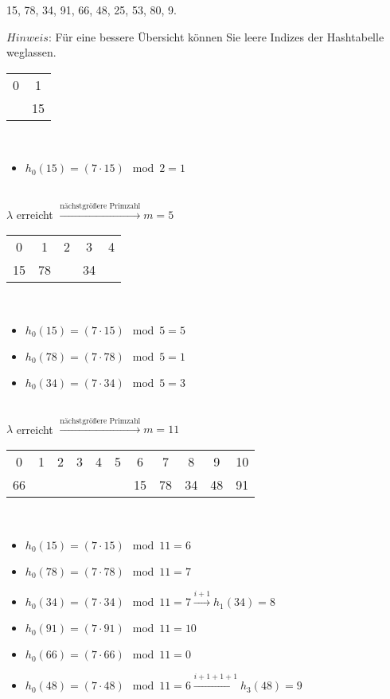 \documentclass[a4paper]{article}
\begin{document}
\begin{center}
    15, 78, 34, 91, 66, 48, 25, 53, 80, 9.
\end{center}

$Hinweis$: Für eine bessere Übersicht können Sie leere Indizes der Hashtabelle weglassen.\\

\begin{tabular}{c|c}
     0 & 1 \\
     & 15
\end{tabular}\\

\begin{itemize}
    \item $h_0(15) = (7 \cdot 15) \mod 2 = 1$
\end{itemize}\\

$\lambda$ erreicht $\xrightarrow{\text{nächstgrößere Primzahl}} m = 5$\\

\begin{tabular}{c|c|c|c|c}
     0 & 1 & 2 & 3 & 4 \\
     15 & 78 & & 34
\end{tabular}\\

\begin{itemize}
    \item $h_0(15) = (7 \cdot 15) \mod 5 = 5$
    \item $h_0(78) = (7 \cdot 78) \mod 5 = 1$
    \item $h_0(34) = (7 \cdot 34) \mod 5 = 3$
\end{itemize}\\

$\lambda$ erreicht $\xrightarrow{\text{nächstgrößere Primzahl}} m = 11$\\

\begin{tabular}{c|c|c|c|c|c|c|c|c|c|c}
     0 & 1 & 2 & 3 & 4 & 5 & 6 & 7 & 8 & 9 & 10 \\
     66 & & & & & & 15& 78 & 34 & 48 & 91
\end{tabular}\\

\begin{itemize}
    \item $h_0(15) = (7 \cdot 15) \mod 11 = 6$
    \item $h_0(78) = (7 \cdot 78) \mod 11 = 7$
    \item $h_0(34) = (7 \cdot 34) \mod 11 = 7 \xrightarrow{i + 1} h_1(34) = 8$
    \item $h_0(91) = (7 \cdot 91) \mod 11 = 10$
    \item $h_0(66) = (7 \cdot 66) \mod 11 = 0$
    \item $h_0(48) = (7 \cdot 48) \mod 11 = 6 \xrightarrow{i + 1 + 1 + 1} h_3(48) = 9$
\end{itemize}\\
\end{document}
